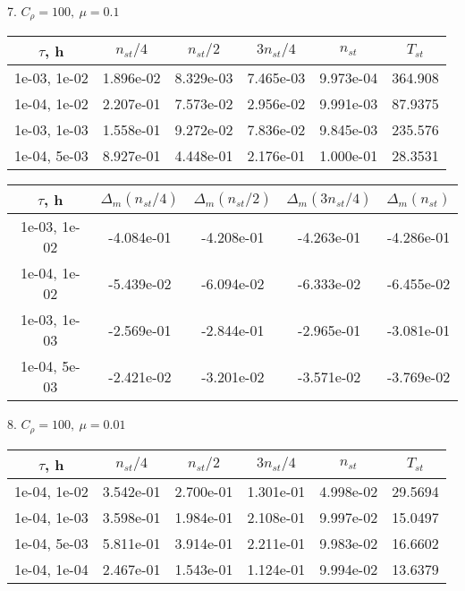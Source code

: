 7. $C_{\rho} = 100, \ \mu = 0.1$
\begin{center}
	\begin{tabular}{ |c|c|c|c|c|c| } 
		\hline
		$\tau$, h & $n_{st}/ 4$ & $n_{st}/ 2$ & $3n_{st}/ 4$ & $n_{st}$ & $T_{st}$ \\ 
		\hline
		1e-03, 1e-02 & 1.896e-02 & 8.329e-03 & 7.465e-03 & 9.973e-04 & 364.908\\ 
		\hline
		1e-04, 1e-02 & 2.207e-01 & 7.573e-02 & 2.956e-02 & 9.991e-03 & 87.9375\\ 
		\hline
		1e-03, 1e-03 & 1.558e-01 & 9.272e-02 & 7.836e-02 & 9.845e-03 & 235.576\\ 
		\hline
		1e-04, 5e-03 & 8.927e-01 & 4.448e-01 & 2.176e-01 & 1.000e-01 & 28.3531\\ 
		\hline
	\end{tabular}
\end{center}

\begin{center}
	\begin{tabular}{ |c|c|c|c|c| } 
		\hline
		$\tau$, h & $\Delta_m (n_{st}/ 4)$ & $\Delta_m (n_{st}/ 2)$ & $\Delta_m (3n_{st}/ 4)$ & $\Delta_m (n_{st})$ \\ 
		\hline
		1e-03, 1e-02 & -4.084e-01 & -4.208e-01 & -4.263e-01 & -4.286e-01 \\ 
		\hline
		1e-04, 1e-02 & -5.439e-02 & -6.094e-02 & -6.333e-02 & -6.455e-02 \\ 
		\hline
		1e-03, 1e-03 & -2.569e-01 & -2.844e-01 & -2.965e-01 & -3.081e-01 \\ 
		\hline
		1e-04, 5e-03 & -2.421e-02 & -3.201e-02 & -3.571e-02 & -3.769e-02 \\ 
		\hline
	\end{tabular}
\end{center}

8. $C_{\rho} = 100, \ \mu = 0.01$
\begin{center}
	\begin{tabular}{ |c|c|c|c|c|c| } 
		\hline
		$\tau$, h & $n_{st}/ 4$ & $n_{st}/ 2$ & $3n_{st}/ 4$ & $n_{st}$ & $T_{st}$ \\ 
		\hline
		1e-04, 1e-02 & 3.542e-01 & 2.700e-01 & 1.301e-01 & 4.998e-02 & 29.5694\\ 
		\hline
		1e-04, 1e-03 & 3.598e-01 & 1.984e-01 & 2.108e-01 & 9.997e-02 & 15.0497\\ 
		\hline
		1e-04, 5e-03 & 5.811e-01 & 3.914e-01 & 2.211e-01 & 9.983e-02 & 16.6602\\ 
		\hline
		1e-04, 1e-04 & 2.467e-01 & 1.543e-01 & 1.124e-01 & 9.994e-02 & 13.6379\\ 
		\hline
	\end{tabular}
\end{center}

